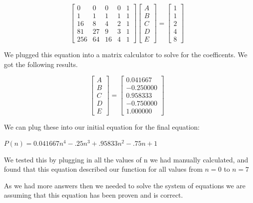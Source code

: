 \documentclass[10pt, AMS Euler]{article}
\begin{document}
	\bigskip
	\[
	\begin{bmatrix}
	0 & 0 & 0 & 0 & 1 \\
	1 & 1 & 1 & 1 & 1 \\
	16 & 8 & 4 & 2 & 1 \\
	81 & 27 & 9 & 3 & 1 \\
	256 & 64 & 16 & 4 & 1
	\end{bmatrix}
	\begin{bmatrix}
	A \\
	B \\
	C \\
	D \\
	E
	\end{bmatrix}
	=
	\begin{bmatrix}
	1 \\
	1 \\
	2 \\
	4 \\
	8
	\end{bmatrix}
	\]

	\bigskip
	\noindent We plugged this equation into a matrix calculator to solve for the coefficents. We got the following results.

	\bigskip
	\[
	\begin{bmatrix}
	A \\
	B \\
	C \\
	D \\
	E
	\end{bmatrix}
	=
	\begin{bmatrix}
	0.041667 \\
	-0.250000 \\
	0.958333 \\
	-0.750000 \\
	1.000000
	\end{bmatrix}
	\]

	\bigskip
	\noindent We can plug these into our initial equation for the final equation:

	\bigskip
	$\boxed{P(n) = 0.041667n^4 - .25n^3 + .95833 n^2 - .75 n + 1}$

	\bigskip
	\noindent We tested this by plugging in all the values of n we had manually calculated, and found that this equation described our function for all values from $ n = 0$ to $n = 7$

	\bigskip
	\noindent As we had more answers then we needed to solve the system of equations we are assuming that this equation has been proven and is correct. 
	
	\noindent \underline{\hspace{5in}}
	
\end{document}
